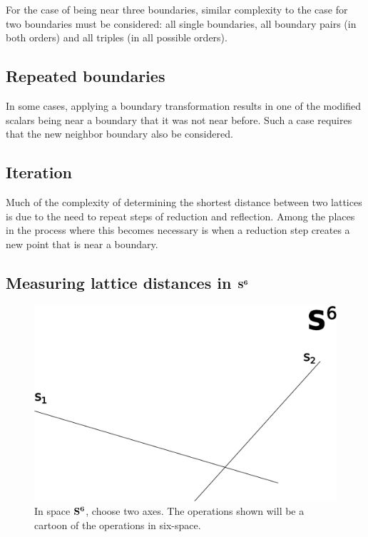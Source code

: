 \documentclass[preprint]{iucr}              %
\numberwithin{equation}{section}
\newcommand{\SVI}[0]{$\bf{S^{6}}$}
\begin{document}
	For the case of being near three boundaries, similar complexity to
	the case for two boundaries must be considered: all single 
	boundaries, all boundary pairs (in both orders) and all 
	triples (in all possible orders).
	
	\subsection{Repeated boundaries}
	
	In some cases, applying a boundary transformation results
	in one of the modified scalars being near a boundary
	that it was not near before. Such a case requires that the
	new neighbor boundary also be considered.
		
	
	\subsection{Iteration}
	
	Much of the complexity of determining the shortest distance between two
	lattices is due to the need to repeat steps of reduction and reflection.
	Among the places in the process where this becomes necessary is when a
	reduction step creates a new point that is near a boundary.
	
	\subsection{Measuring lattice distances in \SVI{}}

\begin{figure}
\includegraphics[height=0.6\textwidth]{S6_1}
\caption{In space \SVI{}, choose two axes. The operations shown
will be a cartoon of the operations in six-space.}
\label{S6_1}
\end{figure}
\end{document}
